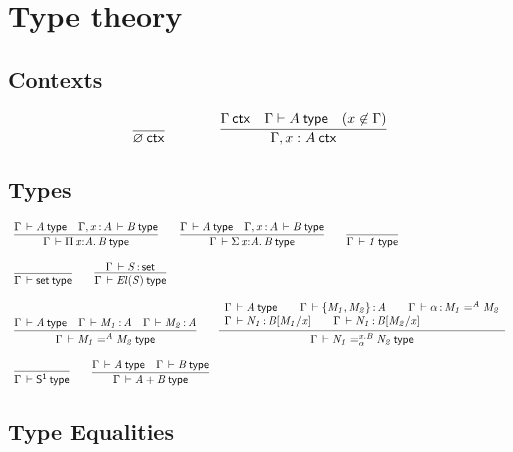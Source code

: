 \section{Type theory}

\subsection{Contexts}

\begin{small}
  \[
  \infer{\wfctx{\varnothing}}{}
  \qquad\qquad
  \infer{\wfctx{\Gamma,x:A}}
  {\wfctx{\Gamma}
    & \wftype{\Gamma}{A}
    & (x\not\in\Gamma)}
  \]
\end{small}

\subsection{Types}

\begin{small}
\[
\begin{array}{l}
\infer{\wftp{\Gamma}{\picl{x}{A}{B}}}
      {\wftp{\Gamma}{A} & \wftp{\Gamma,\tptm{x}{A}}{B}}
\qquad
\infer{\wftp{\Gamma}{\sigmacl{x}{A}{B}}}
      {\wftp{\Gamma}{A} & \wftp{\Gamma,\tptm{x}{A}}{B}}
\qquad
\infer{\wftp{\Gamma}{1}}{}
\\ \\ 
\infer{\wftp{\Gamma}{\set}}{}
\qquad
\infer{\wftp{\Gamma}{\el{S}}}{\oftp{\Gamma}{S}{\set}}
\\ \\
\infer{\wftp{\Gamma}{\iid{A}{M_1}{M_2}}}
      {\wftp{\Gamma}{A} &
       \oftp{\Gamma}{M_1}{A} & 
       \oftp{\Gamma}{M_2}{A}}
\qquad
\infer{\wftp{\Gamma}{\iidover{x.B}{\alpha}{N_1}{N_2}}}
      {\begin{array}{l}
       \wftp{\Gamma}{A} \qquad
       \oftp{\Gamma}{\{M_1,M_2\}}{A}  \qquad
       \oftp{\Gamma}{\alpha}{\iid{A}{M_1}{M_2}} \\ 
       \oftp{\Gamma}{N_1}{\subst{B}{M_1}{x}} \qquad
       \oftp{\Gamma}{N_1}{\subst{B}{M_2}{x}} 
        \end{array}
        }
\\ \\
\infer{\wftp{\Gamma}{\sone}}{}
\qquad
\infer{\wftp{\Gamma}{\sm{A}{B}}}{\wftp{\Gamma}{A} & \wftp{\Gamma}{B}}
\end{array}
\]
\end{small}

\subsection{Type Equalities}

